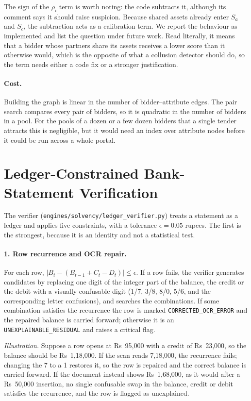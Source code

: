 The sign of the $\rho_i$ term is worth noting: the code subtracts it, although its comment says it should raise suspicion. Because shared assets already enter $S_a$ and $S_c$, the subtraction acts as a calibration term. We report the behaviour as implemented and list the question under future work. Read literally, it means that a bidder whose partners share its assets receives a lower score than it otherwise would, which is the opposite of what a collusion detector should do, so the term needs either a code fix or a stronger justification.

\paragraph{Cost.} Building the graph is linear in the number of bidder--attribute edges. The pair search compares every pair of bidders, so it is quadratic in the number of bidders in a pool. For the pools of a dozen or a few dozen bidders that a single tender attracts this is negligible, but it would need an index over attribute nodes before it could be run across a whole portal.

\section{Ledger-Constrained Bank-Statement Verification}
\label{sec:ledger}
The verifier (\texttt{engines/solvency/ledger\_verifier.py}) treats a statement as a ledger and applies five constraints, with a tolerance $\epsilon=0.05$ rupees. The first is the strongest, because it is an identity and not a statistical test.

\paragraph{1. Row recurrence and OCR repair.} For each row, $|B_t-(B_{t-1}+C_t-D_t)|\le\epsilon$. If a row fails, the verifier generates candidates by replacing one digit of the integer part of the balance, the credit or the debit with a visually confusable digit (1/7, 3/8, 8/0, 5/6, and the corresponding letter confusions), and searches the combinations. If some combination satisfies the recurrence the row is marked \texttt{CORRECTED\_OCR\_ERROR} and the repaired balance is carried forward; otherwise it is an \texttt{UNEXPLAINABLE\_RESIDUAL} and raises a critical flag.

\emph{Illustration.} Suppose a row opens at Rs~95{,}000 with a credit of Rs~23{,}000, so the balance should be Rs~1{,}18{,}000. If the scan reads 7{,}18{,}000, the recurrence fails; changing the 7 to a 1 restores it, so the row is repaired and the correct balance is carried forward. If the document instead shows Rs~1{,}68{,}000, as it would after a Rs~50{,}000 insertion, no single confusable swap in the balance, credit or debit satisfies the recurrence, and the row is flagged as unexplained.

